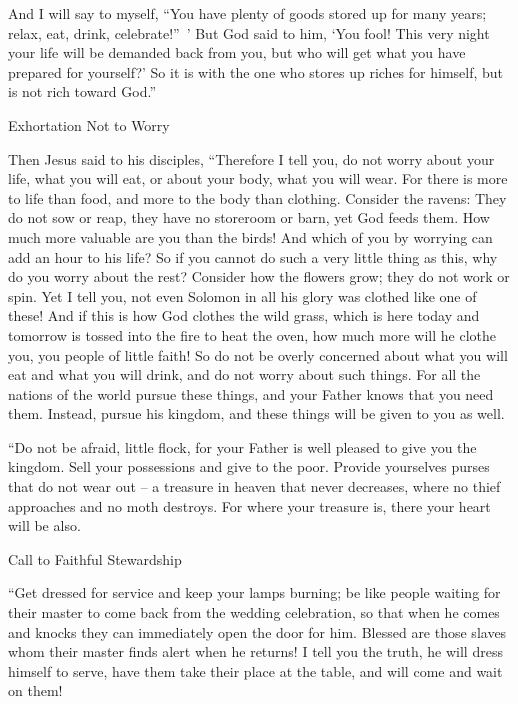 {And I will say to myself, “You have plenty of goods stored up for many years; relax, eat, drink, celebrate!” ’
But God said to him, ‘You fool! This very night your life will be demanded back from you, but who will get what you have prepared for yourself?’
So it is with the one who stores up riches for himself, but is not rich toward God.”
\par }{\SH Exhortation Not to Worry
\par }{\PP {}Then Jesus said to his disciples, “Therefore I tell you, do not worry about your life, what you will eat, or about your body, what you will wear.
For there is more to life than food, and more to the body than clothing.
Consider the ravens: They do not sow or reap, they have no storeroom or barn, yet God feeds them. How much more valuable are you than the birds!
And which of you by worrying can add an hour to his life?
So if you cannot do such a very little thing as this, why do you worry about the rest?
Consider how the flowers grow; they do not work or spin. Yet I tell you, not even Solomon in all his glory was clothed like one of these!
And if this is how God clothes the wild grass, which is here today and tomorrow is tossed into the fire to heat the oven, how much more will he clothe you, you people of little faith!
So do not be overly concerned about what you will eat and what you will drink, and do not worry about such things.
For all the nations of the world pursue these things, and your Father knows that you need them.
Instead, pursue his kingdom, and these things will be given to you as well.
\par }{\PP {}“Do not be afraid, little flock, for your Father is well pleased to give you the kingdom.
Sell your possessions and give to the poor. Provide yourselves purses that do not wear out – a treasure in heaven that never decreases, where no thief approaches and no moth destroys.
For where your treasure is, there your heart will be also.
\par }{\SH Call to Faithful Stewardship
\par }{\PP {}“Get dressed for service and keep your lamps burning;
be like people waiting for their master to come back from the wedding celebration, so that when he comes and knocks they can immediately open the door for him.
Blessed are those slaves whom their master finds alert when he returns! I tell you the truth, he will dress himself to serve, have them take their place at the table, and will come and wait on them!
}
